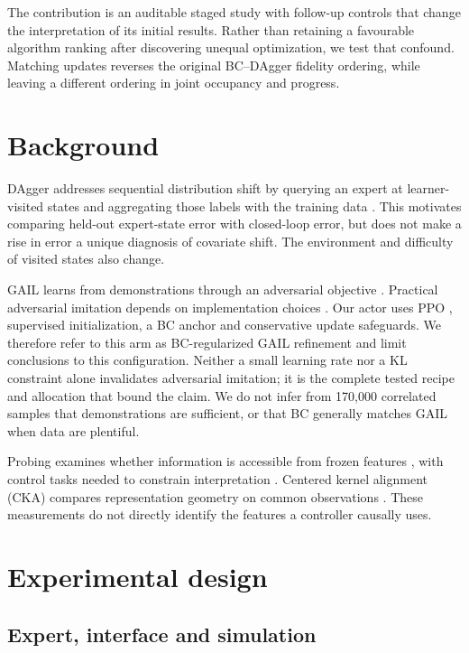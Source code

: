 \documentclass[10pt,a4paper,twocolumn]{article}
\begin{document}
The contribution is an auditable staged study with follow-up controls that change the interpretation of its initial results. Rather than retaining a favourable algorithm ranking after discovering unequal optimization, we test that confound. Matching updates reverses the original BC--DAgger fidelity ordering, while leaving a different ordering in joint occupancy and progress.

\section{Background}

DAgger addresses sequential distribution shift by querying an expert at learner-visited states and aggregating those labels with the training data \citep{ross2011}. This motivates comparing held-out expert-state error with closed-loop error, but does not make a rise in error a unique diagnosis of covariate shift. The environment and difficulty of visited states also change.

GAIL learns from demonstrations through an adversarial objective \citep{ho2016}. Practical adversarial imitation depends on implementation choices \citep{orsini2021}. Our actor uses PPO \citep{schulman2017}, supervised initialization, a BC anchor and conservative update safeguards. We therefore refer to this arm as BC-regularized GAIL refinement and limit conclusions to this configuration. Neither a small learning rate nor a KL constraint alone invalidates adversarial imitation; it is the complete tested recipe and allocation that bound the claim. We do not infer from 170,000 correlated samples that demonstrations are sufficient, or that BC generally matches GAIL when data are plentiful.

Probing examines whether information is accessible from frozen features \citep{alain2016}, with control tasks needed to constrain interpretation \citep{hewitt2019}. Centered kernel alignment (CKA) compares representation geometry on common observations \citep{kornblith2019}. These measurements do not directly identify the features a controller causally uses.

\section{Experimental design}

\subsection{Expert, interface and simulation}
\end{document}
